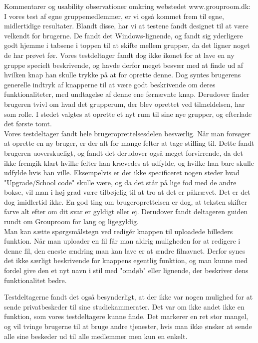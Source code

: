 \documentclass[12pt]{article}
\begin{document}
\noindent Kommentarer og usability observationer omkring webstedet www.grouproom.dk:\\

\noindent I vores test af egne gruppemedlemmer, er vi også kommet frem til egne, midlertidige resultater. Blandt disse, har vi at testene fandt designet til at være velkendt for brugerne. De fandt det Windows-lignende, og fandt sig yderligere godt hjemme i tabsene i toppen til at skifte mellem grupper, da det ligner noget de har prøvet før. Vores testdeltager fandt dog ikke ikonet for at lave en ny gruppe specielt beskrivende, og havde derfor meget besvær med at finde ud af hvilken knap han skulle trykke på at for oprette denne. Dog syntes brugerens generelle indtryk af knapperne til at være godt beskrivende om deres funktionaliteter, med undtagelse af denne ene førnævnte knap. Derudover finder brugeren tvivl om hvad det grupperum, der blev oprettet ved tilmeldelsen, har som rolle. I stedet valgtes at oprette et nyt rum til sine nye grupper, og efterlade det første tomt.\\

\noindent Vores testdeltager fandt hele brugeroprettelsesdelen besværlig. Når man forsøger at oprette en ny bruger, er der alt for mange felter at tage stilling til. Dette fandt brugeren uoverskueligt, og fandt det derudover også meget forvirrende, da det ikke fremgik klart hvilke felter han krævedes at udfylde, og hvilke han bare skulle udfylde hvis han ville. Eksempelvis er det ikke specificeret nogen steder hvad "Upgrade/School code" skulle være, og da det står på lige fod med de andre bokse, vil man i høj grad være tilbøjelig til at tro at det er påkrævet. Det er det dog imidlertid ikke. En god ting om brugeroprettelsen er dog, at teksten skifter farve alt efter om dit svar er gyldigt eller ej. Derudover fandt deltageren guiden rundt om Grouproom for lang og ligegyldig.\\

\noindent Man kan sætte spørgsmålstegn ved redigér knappen til uploadede billeders funktion. Når man uploader en fil får man aldrig muligheden for at redigere i denne fil, den eneste ændring man kan lave er at ændre filnavnet. Derfor synes det ikke særligt beskrivende for knappens egentlig funktion, og man kunne med fordel give den et nyt navn i stil med "omdøb" eller lignende, der beskriver dens funktionalitet bedre.\\

\newpage

\noindent Testdeltagerne fandt det også besynderligt, at der ikke var nogen mulighed for at sende privatbeskeder til sine studiekammerater. Det var om ikke andet ikke en funktion, som vores testdeltagere kunne finde. Det markerer en ret stor mangel, og vil tvinge brugerne til at bruge andre tjenester, hvis man ikke ønsker at sende alle sine beskeder ud til alle medlemmer men kun en enkelt.\\
\end{document}
